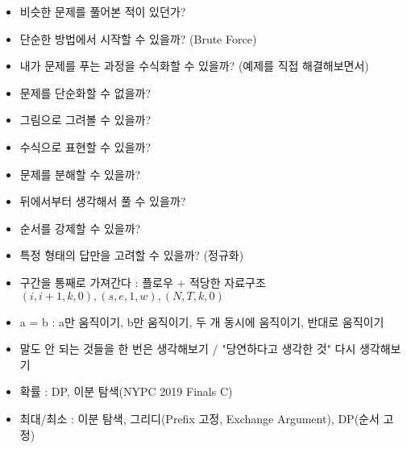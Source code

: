 \documentclass[landscape, 8pt, a4paper, twocolumn]{extarticle} %
\begin{document}

\begin{itemize}
    \setlength\itemsep{0.1em}
    \item 비슷한 문제를 풀어본 적이 있던가?
    \item 단순한 방법에서 시작할 수 있을까? (Brute Force)
    \item 내가 문제를 푸는 과정을 수식화할 수 있을까? (예제를 직접 해결해보면서)
    \item 문제를 단순화할 수 없을까?
    \item 그림으로 그려볼 수 있을까?
    \item 수식으로 표현할 수 있을까?
    \item 문제를 분해할 수 있을까?
    \item 뒤에서부터 생각해서 풀 수 있을까?
    \item 순서를 강제할 수 있을까?
    \item 특정 형태의 답만을 고려할 수 있을까? (정규화)
    \item 구간을 통째로 가져간다 : 플로우 + 적당한 자료구조 $(i,i+1,k,0),(s,e,1,w),(N,T,k,0)$
    \item a = b : a만 움직이기, b만 움직이기, 두 개 동시에 움직이기, 반대로 움직이기
    \item 말도 안 되는 것들을 한 번은 생각해보기 / "당연하다고 생각한 것" 다시 생각해보기
    \item 확률 : DP, 이분 탐색(NYPC 2019 Finals C)
    \item 최대/최소 : 이분 탐색, 그리디(Prefix 고정, Exchange Argument), DP(순서 고정)
\end{itemize}
\end{document}
